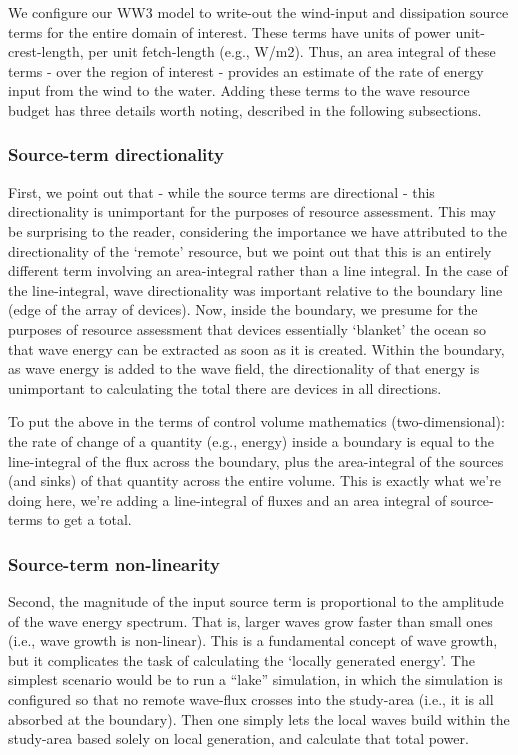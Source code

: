 We configure our WW3 model to write-out the wind-input and dissipation source terms for the entire domain of interest. These terms have units of power unit-crest-length, per unit fetch-length (e.g., W/m2). Thus, an area integral of these terms - over the region of interest - provides an estimate of the rate of energy input from the wind to the water. Adding these terms to the wave resource budget has three details worth noting, described in the following subsections.

\subsubsection{Source-term directionality}

First, we point out that - while the source terms are directional - this directionality is unimportant for the purposes of resource assessment. This may be surprising to the reader, considering the importance we have attributed to the directionality of the ‘remote’ resource, but we point out that this is an entirely different term involving an area-integral rather than a line integral. In the case of the line-integral, wave directionality was important relative to the boundary line (edge of the array of devices). Now, inside the boundary, we presume for the purposes of resource assessment that devices essentially ‘blanket’ the ocean so that wave energy can be extracted as soon as it is created. Within the boundary, as wave energy is added to the wave field, the directionality of that energy is unimportant to calculating the total there are devices in all directions.

To put the above in the terms of control volume mathematics (two-dimensional): the rate of change of a quantity (e.g., energy) inside a boundary is equal to the line-integral of the flux across the boundary, plus the area-integral of the sources (and sinks) of that quantity across the entire volume. This is exactly what we’re doing here, we’re adding a line-integral of fluxes and an area integral of source-terms to get a total.

\subsubsection{Source-term non-linearity}

Second, the magnitude of the input source term is proportional to the amplitude of the wave energy spectrum. That is, larger waves grow faster than small ones (i.e., wave growth is non-linear). This is a fundamental concept of wave growth, but it complicates the task of calculating the ‘locally generated energy’. The simplest scenario would be to run a “lake” simulation, in which the simulation is configured so that no remote wave-flux crosses into the study-area (i.e., it is all absorbed at the boundary). Then one simply lets the local waves build within the study-area based solely on local generation, and calculate that total power.

